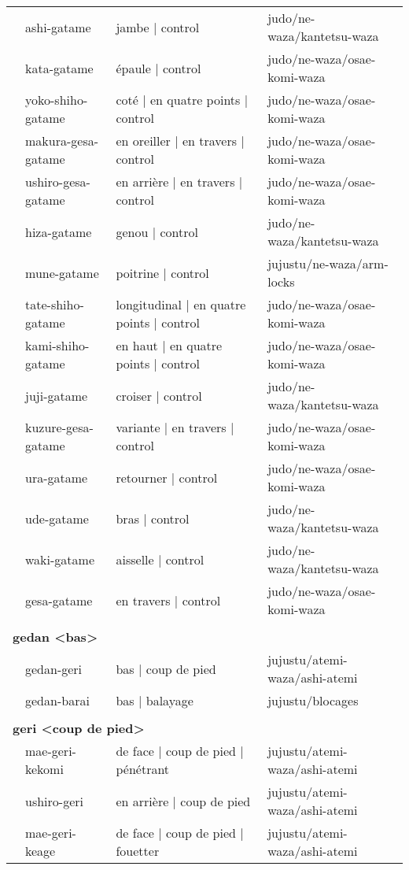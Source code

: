 \documentclass{article}%
\begin{document}
\begin{longtable}{rlll}
&ashi{-}gatame&jambe | control&judo/ne{-}waza/kantetsu{-}waza\\%
&kata{-}gatame&épaule | control&judo/ne{-}waza/osae{-}komi{-}waza\\%
&yoko{-}shiho{-}gatame&coté | en quatre points | control&judo/ne{-}waza/osae{-}komi{-}waza\\%
&makura{-}gesa{-}gatame&en oreiller | en travers | control&judo/ne{-}waza/osae{-}komi{-}waza\\%
&ushiro{-}gesa{-}gatame&en arrière | en travers | control&judo/ne{-}waza/osae{-}komi{-}waza\\%
&hiza{-}gatame&genou | control&judo/ne{-}waza/kantetsu{-}waza\\%
&mune{-}gatame&poitrine | control&jujustu/ne{-}waza/arm{-}locks\\%
&tate{-}shiho{-}gatame&longitudinal | en quatre points | control&judo/ne{-}waza/osae{-}komi{-}waza\\%
&kami{-}shiho{-}gatame&en haut | en quatre points | control&judo/ne{-}waza/osae{-}komi{-}waza\\%
&juji{-}gatame&croiser | control&judo/ne{-}waza/kantetsu{-}waza\\%
&kuzure{-}gesa{-}gatame&variante | en travers | control&judo/ne{-}waza/osae{-}komi{-}waza\\%
&ura{-}gatame&retourner | control&judo/ne{-}waza/osae{-}komi{-}waza\\%
&ude{-}gatame&bras | control&judo/ne{-}waza/kantetsu{-}waza\\%
&waki{-}gatame&aisselle | control&judo/ne{-}waza/kantetsu{-}waza\\%
&gesa{-}gatame&en travers | control&judo/ne{-}waza/osae{-}komi{-}waza\\%
&&&\\%
\multicolumn{3}{l}{\textbf{gedan <bas>}%
~%
}&\\%
&gedan{-}geri&bas | coup de pied&jujustu/atemi{-}waza/ashi{-}atemi\\%
&gedan{-}barai&bas | balayage&jujustu/blocages\\%
&&&\\%
\multicolumn{3}{l}{\textbf{geri <coup de pied>}%
~%
}&\\%
&mae{-}geri{-}kekomi&de face | coup de pied | pénétrant&jujustu/atemi{-}waza/ashi{-}atemi\\%
&ushiro{-}geri&en arrière | coup de pied&jujustu/atemi{-}waza/ashi{-}atemi\\%
&mae{-}geri{-}keage&de face | coup de pied | fouetter&jujustu/atemi{-}waza/ashi{-}atemi\\%

\end{longtable}
\end{document}
